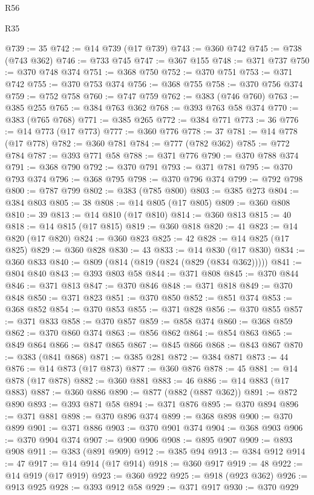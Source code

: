 \begin{lexlean}{R56}
\begin{lexlean}{R35}
\begin{coremodule}
{{{{{{{{{{{{{{{{{{{{{{{{{{{{{{{{{{{{{{{{{{{{{{{{{{{{@739 := 35
@742 := @14 @739 (@17 @739)
@743 := @360 @742
@745 := @738 (@743 @362)
@746 := @733 @745
@747 := @367 @155
@748 := @371 @737
@750 := @370 @748 @374
@751 := @368 @750
@752 := @370 @751
@753 := @371 @742
@755 := @370 @753 @374
@756 := @368 @755
@758 := @370 @756 @374
@759 := @752 @758
@760 := @747 @759
@762 := @383 (@746 @760)
@763 := @385 @255
@765 := @384 @763 @362
@768 := @393 @763 @58 @374
@770 := @383 (@765 @768)
@771 := @385 @265
@772 := @384 @771
@773 := 36
@776 := @14 @773 (@17 @773)
@777 := @360 @776
@778 := 37
@781 := @14 @778 (@17 @778)
@782 := @360 @781
@784 := @777 (@782 @362)
@785 := @772 @784
@787 := @393 @771 @58
@788 := @371 @776
@790 := @370 @788 @374
@791 := @368 @790
@792 := @370 @791
@793 := @371 @781
@795 := @370 @793 @374
@796 := @368 @795
@798 := @370 @796 @374
@799 := @792 @798
@800 := @787 @799
@802 := @383 (@785 @800)
@803 := @385 @273
@804 := @384 @803
@805 := 38
@808 := @14 @805 (@17 @805)
@809 := @360 @808
@810 := 39
@813 := @14 @810 (@17 @810)
@814 := @360 @813
@815 := 40
@818 := @14 @815 (@17 @815)
@819 := @360 @818
@820 := 41
@823 := @14 @820 (@17 @820)
@824 := @360 @823
@825 := 42
@828 := @14 @825 (@17 @825)
@829 := @360 @828
@830 := 43
@833 := @14 @830 (@17 @830)
@834 := @360 @833
@840 := @809 (@814 (@819 (@824 (@829 (@834 @362)))))
@841 := @804 @840
@843 := @393 @803 @58
@844 := @371 @808
@845 := @370 @844
@846 := @371 @813
@847 := @370 @846
@848 := @371 @818
@849 := @370 @848
@850 := @371 @823
@851 := @370 @850
@852 := @851 @374
@853 := @368 @852
@854 := @370 @853
@855 := @371 @828
@856 := @370 @855
@857 := @371 @833
@858 := @370 @857
@859 := @858 @374
@860 := @368 @859
@862 := @370 @860 @374
@863 := @856 @862
@864 := @854 @863
@865 := @849 @864
@866 := @847 @865
@867 := @845 @866
@868 := @843 @867
@870 := @383 (@841 @868)
@871 := @385 @281
@872 := @384 @871
@873 := 44
@876 := @14 @873 (@17 @873)
@877 := @360 @876
@878 := 45
@881 := @14 @878 (@17 @878)
@882 := @360 @881
@883 := 46
@886 := @14 @883 (@17 @883)
@887 := @360 @886
@890 := @877 (@882 (@887 @362))
@891 := @872 @890
@893 := @393 @871 @58
@894 := @371 @876
@895 := @370 @894
@896 := @371 @881
@898 := @370 @896 @374
@899 := @368 @898
@900 := @370 @899
@901 := @371 @886
@903 := @370 @901 @374
@904 := @368 @903
@906 := @370 @904 @374
@907 := @900 @906
@908 := @895 @907
@909 := @893 @908
@911 := @383 (@891 @909)
@912 := @385 @94
@913 := @384 @912
@914 := 47
@917 := @14 @914 (@17 @914)
@918 := @360 @917
@919 := 48
@922 := @14 @919 (@17 @919)
@923 := @360 @922
@925 := @918 (@923 @362)
@926 := @913 @925
@928 := @393 @912 @58
@929 := @371 @917
@930 := @370 @929
}}}}}}}}}}}}}}}}}}}}}}}}}}}}}}}}}}}}}}}}}}}}}}}}}}}}
\end{coremodule}
\end{lexlean}
\end{lexlean}
